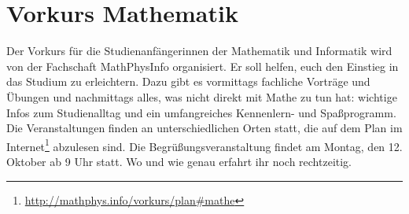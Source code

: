 \section{Vorkurs Mathematik}
Der Vorkurs für die Studienanfängerinnen der Mathematik und Informatik wird von der Fachschaft MathPhysInfo organisiert. Er soll helfen, euch den Einstieg in das Studium zu erleichtern. Dazu gibt es vormittags fachliche Vorträge und Übungen und nachmittags alles, was nicht direkt mit Mathe zu tun hat: wichtige Infos zum Studienalltag und ein umfangreiches Kennenlern- und Spaßprogramm.
Die Veranstaltungen finden an unterschiedlichen Orten statt, die auf dem Plan im Internet\footnote{\url{http://mathphys.info/vorkurs/plan\#mathe}} abzulesen sind. Die Begrüßungsveranstaltung findet am Montag, den 12. Oktober ab 9 Uhr statt. Wo und wie genau erfahrt ihr noch rechtzeitig.
